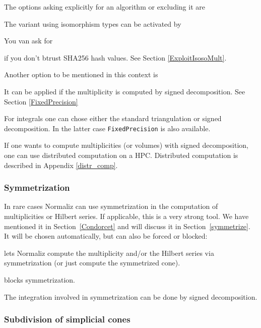 The options asking explicitly for an algorithm  or excluding it are
\begin{itemize}
	\itemtt[Descent, -F]
	\itemtt[NoDescent]
	\itemtt[SignedDec]
	\itemtt[NoSignedDec]
\end{itemize}

The variant using isomorphism types can be activated by
\begin{itemize}
\end{itemize}
You van ask for
\begin{itemize}
	\itemtt[StrictTypeChecking]
\end{itemize}
if you don't btrust SHA256 hash values. See Section \ref{ExploitIsosoMult}.

Another option to be mentioned in this context is
\begin{itemize}
	\itemtt[FixedPrecision]
\end{itemize}
It can be applied if the multiplicity is computed by signed decomposition. See Section \ref{FixedPrecision}

For integrals one can chose either the standard triangulation or signed decomposition. In the latter case \verb|FixedPrecision| is also available.

If one wants to compute multiplicities (or volumes)  with signed decomposition, one can use distributed computation on a HPC. Distributed computation is described in Appendix \ref{distr_comp}.

\subsubsection{Symmetrization}

In rare cases Normaliz can use symmetrization in the computation of multiplicities or Hilbert series. If applicable, this is a very strong tool. We have mentioned it in Section~\ref{Condorcet} and will discuss it in Section~\ref{symmetrize}. It will be chosen automatically, but can also be forced or blocked:
\begin{itemize}
	\itemtt[Symmetrize, -Y] lets Normaliz compute the multiplicity and/or the Hilbert series via symmetrization (or just compute the symmetrized cone).
	
	\itemtt[NoSymmetrization] blocks symmetrization.
\end{itemize}

The integration involved in symmetrization can be done by signed decomposition.

\subsubsection{Subdivision of simplicial cones}

